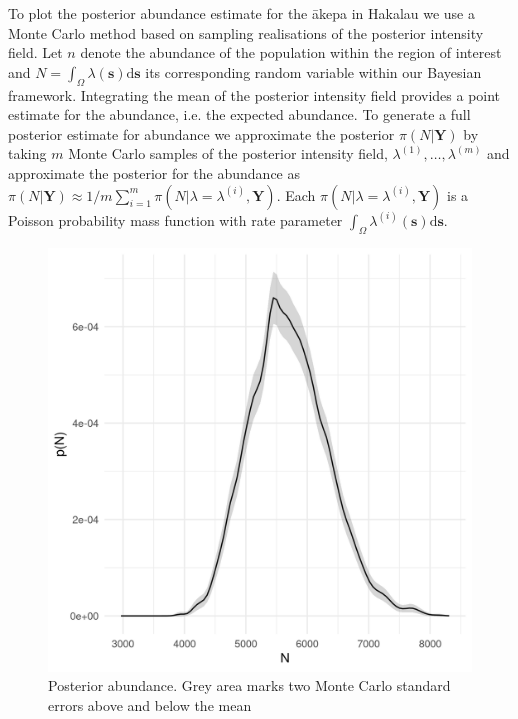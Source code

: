 \documentclass{statsoc}
\newcommand{\bs}{\mathbf{s}}
\newcommand{\bm}{\boldsymbol}  %
\newcommand{\akepa}{\textquotesingle\={a}kepa}  %
\begin{document}
To plot the posterior abundance estimate for the \akepa{} in Hakalau we use a Monte Carlo method based on sampling realisations of the posterior intensity field.  Let $n$ denote the abundance of the population within the region of interest and $N = \int_{\Omega}\lambda(\bs)\mathrm{d}\bs$ its corresponding random variable within our Bayesian framework.  Integrating the mean of the posterior intensity field provides a point estimate for the abundance, i.e. the expected abundance.  To generate a full posterior estimate for abundance we approximate the posterior $\pi(N | \bm{Y})$ by taking $m$ Monte Carlo samples of the posterior intensity field, $\lambda^{(1)}, \ldots, \lambda^{(m)}$ and approximate the posterior for the abundance as $\pi(N | \bm{Y}) \approx 1 / m \sum_{i=1}^m \pi (N | \lambda = \lambda^{(i)}, \bm{Y})$. Each $\pi(N | \lambda = \lambda^{(i)}, \bm{Y})$ is a Poisson probability mass function with rate parameter $\int_{\Omega}\lambda^{(i)}(\bs)\mathrm{d}\bs$. 
\begin{figure}[!htb]
	\begin{center}
		\includegraphics[scale=0.525]{figures/N_posterior.png}
		\caption{Posterior abundance.  Grey area marks two Monte Carlo standard errors above and below the mean}
		\label{fig:realized-abundance-posterior}
	\end{center}
\end{figure}
\end{document}
